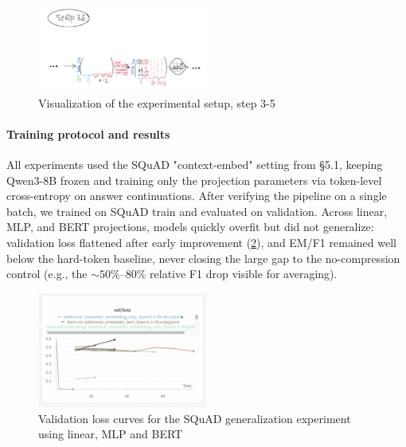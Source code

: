 \begin{figure}[hbt]
  \centering
  \includegraphics[width=0.5\textwidth]{graphs/step3.5.jpg}
  \caption{Visualization of the experimental setup, step 3-5}
  \label{fig:step35}
\end{figure}  

\paragraph{Training protocol and results}
All experiments used the SQuAD \cite{squad} "context-embed" setting from \S5.1, keeping Qwen3-8B frozen and training only the projection parameters via token-level cross-entropy on answer continuations.
After verifying the pipeline on a single batch, we trained on SQuAD train and evaluated on validation.
Across linear, MLP, and BERT projections, models quickly overfit but did not generalize: validation loss flattened after early improvement (\ref{fig:losses_squad_1}), and EM/F1 remained well below the hard-token baseline, never closing the large gap to the no-compression control (e.g., the $\sim 50\%$--$80\%$ relative F1 drop visible for averaging).

\begin{figure}[hbt]
  \centering
  \includegraphics[width=0.5\textwidth]{graphs/losses_squad_1.jpg}
  \caption{Validation loss curves for the SQuAD generalization experiment using linear, MLP and BERT}
  \label{fig:losses_squad_1}
\end{figure}  



